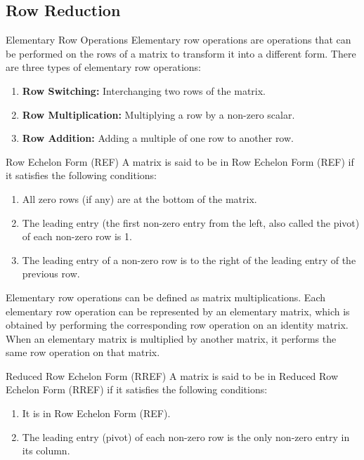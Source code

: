 \documentclass[openany]{book}
\begin{document}
\subsection{Row Reduction}
\begin{mydefinition}{Elementary Row Operations}
Elementary row operations are operations that can be performed on the rows of a matrix to transform it into a different form. There are three types of elementary row operations:
\begin{enumerate}
    \item \textbf{Row Switching:} Interchanging two rows of the matrix.
    \item \textbf{Row Multiplication:} Multiplying a row by a non-zero scalar.
    \item \textbf{Row Addition:} Adding a multiple of one row to another row.
\end{enumerate}
\end{mydefinition}
\begin{mydefinition}{Row Echelon Form (REF)}
A matrix is said to be in Row Echelon Form (REF) if it satisfies the following conditions:
\begin{enumerate}
    \item All zero rows (if any) are at the bottom of the matrix.
    \item The leading entry (the first non-zero entry from the left, also called the pivot) of each non-zero row is 1.
    \item The leading entry of a non-zero row is to the right of the leading entry of the previous row.
\end{enumerate}
\end{mydefinition}
Elementary row operations can be defined as matrix multiplications. Each elementary row operation can be represented by an elementary matrix, which is obtained by performing the corresponding row operation on an identity matrix. When an elementary matrix is multiplied by another matrix, it performs the same row operation on that matrix.
\begin{mydefinition}{Reduced Row Echelon Form (RREF)}
A matrix is said to be in Reduced Row Echelon Form (RREF) if it satisfies the following conditions:
\begin{enumerate}
    \item It is in Row Echelon Form (REF).
    \item The leading entry (pivot) of each non-zero row is the only non-zero entry in its column.
\end{enumerate}
\end{mydefinition}
\end{document}
